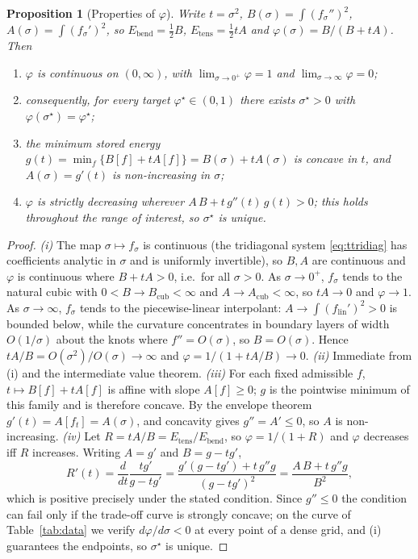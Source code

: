 \documentclass[]{interact}
\theoremstyle{plain}
\newtheorem{proposition}{Proposition}
\begin{document}
\begin{proposition}[Properties of $\varphi$]\label{prop:phi}
Write $t=\sigma^2$, $B(\sigma)=\int(f_\sigma'')^2$, $A(\sigma)=\int(f_\sigma')^2$, so
$E_{\mathrm{bend}}=\tfrac12 B$, $E_{\mathrm{tens}}=\tfrac12 t A$ and
$\varphi(\sigma)=B/(B+tA)$. Then
\begin{enumerate}[leftmargin=2em,itemsep=1pt]
\item[(i)] $\varphi$ is continuous on $(0,\infty)$, with $\lim_{\sigma\to0^+}\varphi=1$ and
$\lim_{\sigma\to\infty}\varphi=0$;
\item[(ii)] consequently, for every target $\varphi^\star\in(0,1)$ there exists
$\sigma^\star>0$ with $\varphi(\sigma^\star)=\varphi^\star$;
\item[(iii)] the minimum stored energy $g(t)=\min_f\{B[f]+tA[f]\}=B(\sigma)+tA(\sigma)$ is
concave in $t$, and $A(\sigma)=g'(t)$ is non-increasing in $\sigma$;
\item[(iv)] $\varphi$ is strictly decreasing wherever $A\,B+t\,g''(t)\,g(t)>0$; this holds
throughout the range of interest, so $\sigma^\star$ is unique.
\end{enumerate}
\end{proposition}
\begin{proof}
\emph{(i)} The map $\sigma\mapsto f_\sigma$ is continuous (the tridiagonal system
\eqref{eq:ttridiag} has coefficients analytic in $\sigma$ and is uniformly invertible), so
$B,A$ are continuous and $\varphi$ is continuous where $B+tA>0$, i.e.\ for all $\sigma>0$. As
$\sigma\to0^+$, $f_\sigma$ tends to the natural cubic with $0<B\to B_{\mathrm{cub}}<\infty$ and
$A\to A_{\mathrm{cub}}<\infty$, so $tA\to0$ and $\varphi\to1$. As $\sigma\to\infty$, $f_\sigma$
tends to the piecewise-linear interpolant: $A\to\int(f_{\mathrm{lin}}')^2>0$ is bounded below,
while the curvature concentrates in boundary layers of width $O(1/\sigma)$ about the knots where
$f''=O(\sigma)$, so $B=O(\sigma)$. Hence $tA/B=O(\sigma^2)/O(\sigma)\to\infty$ and
$\varphi=1/(1+tA/B)\to0$.
\emph{(ii)} Immediate from (i) and the intermediate value theorem.
\emph{(iii)} For each fixed admissible $f$, $t\mapsto B[f]+tA[f]$ is affine with slope
$A[f]\ge0$; $g$ is the pointwise minimum of this family and is therefore concave. By the
envelope theorem $g'(t)=A[f_t]=A(\sigma)$, and concavity gives $g''=A'\le0$, so $A$ is
non-increasing.
\emph{(iv)} Let $R=tA/B=E_{\mathrm{tens}}/E_{\mathrm{bend}}$, so $\varphi=1/(1+R)$ and $\varphi$
decreases iff $R$ increases. Writing $A=g'$ and $B=g-tg'$,
\[
R'(t)=\frac{d}{dt}\frac{tg'}{g-tg'}=\frac{g'(g-tg')+t\,g''g}{(g-tg')^2}=\frac{A\,B+t\,g''g}{B^2},
\]
which is positive precisely under the stated condition. Since $g''\le0$ the condition can fail
only if the trade-off curve is strongly concave; on the curve of Table~\ref{tab:data} we verify
$d\varphi/d\sigma<0$ at every point of a dense grid, and (i) guarantees the endpoints, so
$\sigma^\star$ is unique.
\end{proof}
\end{document}
